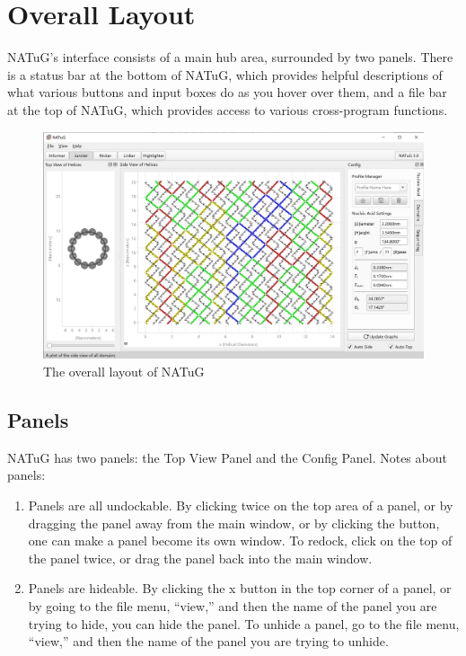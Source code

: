 \documentclass[titlepage]{article}
\begin{document}
	\section{Overall Layout}
	
	NATuG’s interface consists of a main hub area, surrounded by two panels. There is a status bar at the bottom of NATuG, which provides helpful descriptions of what various buttons and input boxes do as you hover over them, and a file bar at the top of NATuG, which provides access to various cross-program functions.
	
	\begin{figure}[h]
		\centering
		\caption{The overall layout of NATuG}
		\label{program-layout}
		\includegraphics[width=5in]{program-layout.png}
	\end{figure}

	\subsection{Panels}
	NATuG has two panels: the Top View Panel and the Config Panel. Notes about panels:
	
	\begin{enumerate}
		\item Panels are all undockable. By clicking twice on the top area of a panel, or by dragging the panel away from the main window, or by clicking the  button, one can make a panel become its own window. To redock, click on the top of the panel twice, or drag the panel back into the main window. 
		\item Panels are hideable. By clicking the x button in the top corner of a panel, or by going to the file menu, “view,” and then the name of the panel you are trying to hide, you can hide the panel. To unhide a panel, go to the file menu, “view,” and then the name of the panel you are trying to unhide. 
	\end{enumerate}
\end{document}
